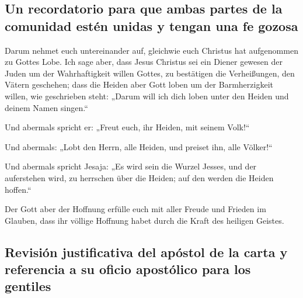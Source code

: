 \hypertarget{un-recordatorio-para-que-ambas-partes-de-la-comunidad-estuxe9n-unidas-y-tengan-una-fe-gozosa}{%
\subsection{Un recordatorio para que ambas partes de la comunidad estén
unidas y tengan una fe
gozosa}\label{un-recordatorio-para-que-ambas-partes-de-la-comunidad-estuxe9n-unidas-y-tengan-una-fe-gozosa}}

 Darum nehmet euch untereinander auf, gleichwie euch
Christus hat aufgenommen zu Gottes Lobe.  Ich sage aber,
dass Jesus Christus sei ein Diener gewesen der Juden um der
Wahrhaftigkeit willen Gottes, zu bestätigen die Verheißungen, den Vätern
geschehen;  dass die Heiden aber Gott loben um der
Barmherzigkeit willen, wie geschrieben steht: „Darum will ich dich loben
unter den Heiden und deinem Namen singen.``

 Und abermals spricht er: „Freut euch, ihr Heiden, mit
seinem Volk!{}``

 Und abermals: „Lobt den Herrn, alle Heiden, und preiset
ihn, alle Völker!{}``

 Und abermals spricht Jesaja: „Es wird sein die Wurzel
Jesses, und der auferstehen wird, zu herrschen über die Heiden; auf den
werden die Heiden hoffen.``

 Der Gott aber der Hoffnung erfülle euch mit aller Freude
und Frieden im Glauben, dass ihr völlige Hoffnung habet durch die Kraft
des heiligen Geistes.

\hypertarget{revisiuxf3n-justificativa-del-apuxf3stol-de-la-carta-y-referencia-a-su-oficio-apostuxf3lico-para-los-gentiles}{%
\subsection{Revisión justificativa del apóstol de la carta y referencia
a su oficio apostólico para los
gentiles}\label{revisiuxf3n-justificativa-del-apuxf3stol-de-la-carta-y-referencia-a-su-oficio-apostuxf3lico-para-los-gentiles}}

